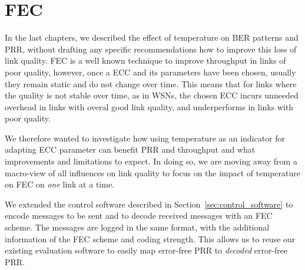 \chapter{\acl{FEC}}
\label{chap:forward_error_correction}

In the last chapters, we described the effect of temperature on \ac{BER} patterns and \ac{PRR}, without drafting any specific recommendations how to improve this loss of link quality.
\ac{FEC} is a well known technique to improve throughput in links of poor quality, however, once a \ac{ECC} and its parameters have been chosen, usually they remain static and do not change over time.
This means that for links where the quality is not stable over time, as in \acp{WSN}, the chosen \ac{ECC} incurs unneeded overhead in links with overal good link quality, and underperforms in links with poor quality.

We therefore wanted to investigate how using temperature as an indicator for adapting \ac{ECC} parameter can benefit \ac{PRR} and throughput and what improvements and limitations to expect.
In doing so, we are moving away from a macro-view of all influences on link quality to focus on the impact of temperature on \ac{FEC} on \emph{one} link at a time.

We extended the control software described in Section~\ref{sec:control_software} to encode messages to be sent and to decode received messages with an \ac{FEC} scheme.
The messages are logged in the same format, with the additional information of the FEC scheme and coding strength.
This allows us to reuse our existing evaluation software to easily map error-free \ac{PRR} to \emph{decoded} error-free \ac{PRR}.










